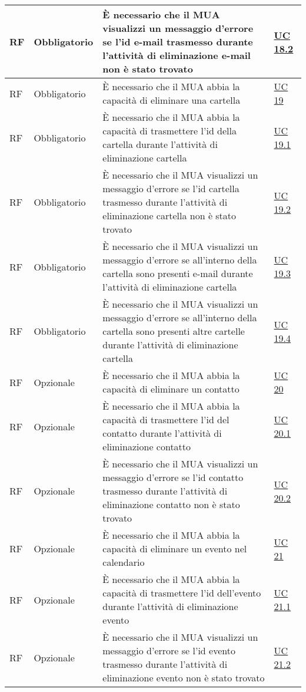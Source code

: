 \begin{longtable}{*{1}{>{\centering\arraybackslash}p{1.5cm}}*{1}{>{\centering\arraybackslash}p{2.5cm}}p{6cm}*{1}{>{\centering\arraybackslash}p{3cm}}}
    RF & Obbligatorio & È necessario che il MUA visualizzi un messaggio d'errore se l'id e-mail trasmesso durante l'attività di eliminazione e-mail non è stato trovato & \hyperref[sec:UC18.2]{UC 18.2}
    \\\hline
    RF & Obbligatorio & È necessario che il MUA abbia la capacità di eliminare una cartella & \hyperref[sec:UC19]{UC 19}
    \\\hline
    RF & Obbligatorio & È necessario che il MUA abbia la capacità di trasmettere l'id della cartella durante l'attività di eliminazione cartella & \hyperref[sec:UC19.1]{UC 19.1}
    \\\hline
    RF & Obbligatorio & È necessario che il MUA visualizzi un messaggio d'errore se l'id cartella trasmesso durante l'attività di eliminazione cartella non è stato trovato & \hyperref[sec:UC19.2]{UC 19.2}
    \\\hline
    RF & Obbligatorio & È necessario che il MUA visualizzi un messaggio d'errore se all'interno della cartella sono presenti e-mail durante l'attività di eliminazione cartella & \hyperref[sec:UC19.3]{UC 19.3}
    \\\hline
    RF & Obbligatorio & È necessario che il MUA visualizzi un messaggio d'errore se all'interno della cartella sono presenti altre cartelle durante l'attività di eliminazione cartella & \hyperref[sec:UC19.4]{UC 19.4}
    \\\hline
    RF & Opzionale & È necessario che il MUA abbia la capacità di eliminare un contatto & \hyperref[sec:UC20]{UC 20}
    \\\hline
    RF & Opzionale & È necessario che il MUA abbia la capacità di trasmettere l'id del contatto durante l'attività di eliminazione contatto & \hyperref[sec:UC20.1]{UC 20.1}
    \\\hline
    RF & Opzionale & È necessario che il MUA visualizzi un messaggio d'errore se l'id contatto trasmesso durante l'attività di eliminazione contatto non è stato trovato & \hyperref[sec:UC20.2]{UC 20.2}
    \\\hline
    RF & Opzionale & È necessario che il MUA abbia la capacità di eliminare un evento nel calendario & \hyperref[sec:UC21]{UC 21}
    \\\hline
    RF & Opzionale & È necessario che il MUA abbia la capacità di trasmettere l'id dell'evento durante l'attività di eliminazione evento & \hyperref[sec:UC21.1]{UC 21.1}
    \\\hline
    RF & Opzionale & È necessario che il MUA visualizzi un messaggio d'errore se l'id evento trasmesso durante l'attività di eliminazione evento non è stato trovato & \hyperref[sec:UC21.2]{UC 21.2}

\end{longtable}
